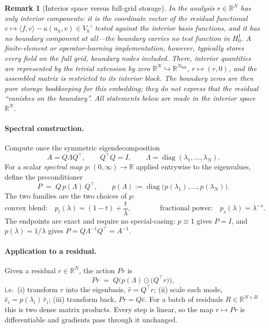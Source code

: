 \documentclass[11pt]{article}
\newtheorem{remark}{Remark}
\newcommand{\R}{\mathbb{R}}
\DeclareMathOperator{\diag}{diag}
\begin{document}
\begin{remark}[Interior space versus full-grid storage]
In the analysis $r\in\R^N$ has \emph{only} interior components: it is the coordinate vector
of the residual functional $v\mapsto \langle f,v\rangle - a(u_h,v)\in V_h'$ tested against
the interior basis functions, and it has no boundary component at all---the boundary carries
no test function in $H_0^1$. A finite-element or operator-learning implementation, however,
typically stores every field on the \emph{full} grid, boundary nodes included. There,
interior quantities are represented by the trivial extension by zero
$\R^{N}\hookrightarrow\R^{N_{\mathrm{full}}}$, $r\mapsto(r,0)$, and the assembled matrix is
restricted to its interior block. The boundary zeros are then pure storage
bookkeeping for this embedding; they do \emph{not} express that the residual ``vanishes on
the boundary''. All statements below are made in the interior space $\R^N$.
\end{remark}

\paragraph{Spectral construction.}
Compute once the symmetric eigendecomposition
\begin{equation}
  A = Q\Lambda Q^\top, \qquad Q^\top Q = I, \qquad \Lambda=\diag(\lambda_1,\dots,\lambda_N).
\end{equation}
For a scalar \emph{spectral map} $p:(0,\infty)\to\R$ applied entrywise to the eigenvalues,
define the preconditioner
\begin{equation}
  P \;=\; Q\,p(\Lambda)\,Q^\top,
  \qquad p(\Lambda) := \diag\big(p(\lambda_1),\dots,p(\lambda_N)\big).
\end{equation}
The two families are the two choices of $p$:
\begin{equation}
  \text{convex blend:}\quad p_t(\lambda) = (1-t) + \frac{t}{\lambda},
  \qquad\qquad
  \text{fractional power:}\quad p_s(\lambda) = \lambda^{-s}.
\end{equation}
The endpoints are exact and require no special-casing: $p\equiv 1$ gives $P=I$, and
$p(\lambda)=1/\lambda$ gives $P=Q\Lambda^{-1}Q^\top=A^{-1}$.

\paragraph{Application to a residual.}
Given a residual $r\in\R^{N}$, the action $Pr$ is
\begin{equation}
  Pr \;=\; Q\Big( p(\Lambda)\odot \big(Q^\top r\big)\Big),
  \label{eq:apply}
\end{equation}
i.e.\ (i) transform $r$ into the eigenbasis, $\hat r = Q^\top r$; (ii) scale each mode,
$\hat e_i = p(\lambda_i)\,\hat r_i$; (iii) transform back, $Pr = Q\hat e$. For a batch of
residuals $R\in\R^{N\times B}$ this is two dense matrix products. Every step is linear, so
the map $r\mapsto Pr$ is differentiable and gradients pass through it unchanged.
\end{document}
